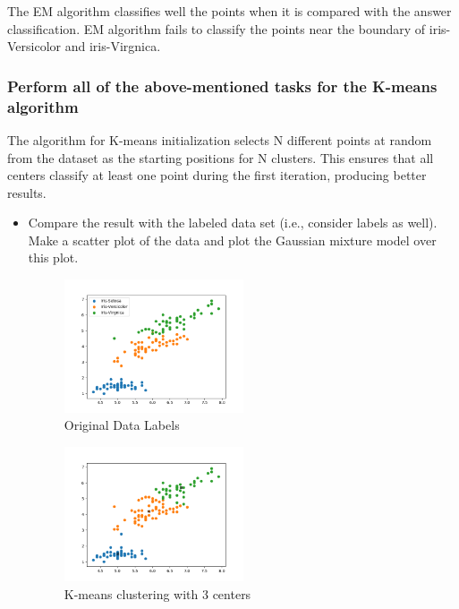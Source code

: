 \documentclass[a4paper]{article}
\begin{document}
\begin{itemize}
	The EM algorithm classifies well the points when it is compared with the answer classification. EM algorithm fails to classify the points near the boundary of iris-Versicolor and iris-Virgnica.
	\end{itemize}

	\subsubsection{Perform all of the above-mentioned tasks for the K-means algorithm}
	The algorithm for K-means initialization selects N different points at random from the dataset as the starting positions for N clusters.  This ensures that all centers classify at least one point during the first iteration, producing better results.
	\begin{itemize}
	\item Compare the result with the labeled data set (i.e., consider labels as well). Make a scatter plot of the data and plot the Gaussian mixture model over this plot.

	\begin{figure}[h]
		\begin{center}
			\includegraphics[width=0.5\textwidth]{answer.png}
			\caption{Original Data Labels}
		\end{center}
	\end{figure}

	\begin{figure}[h]
		\begin{center}
			\includegraphics[width=0.5\textwidth]{kmeans_cluster.png}
			\caption{K-means clustering with 3 centers}
		\end{center}
	\end{figure}
	

\end{itemize}
\end{document}
